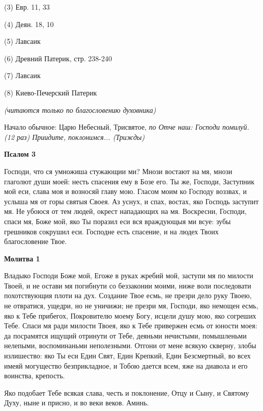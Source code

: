 (3) Евр. 11, 33

(4) Деян. 18, 10

(5) Лавсаик

(6) Древний Патерик, стр. 238-240

(7) Лавсаик

(8) Киево-Печерский Патерик


\mychapterending

 


\itshape (читаются только по благословению духовника)

\normalfont{}

Начало обычное: Царю Небесный,  Трисвятое,  \itshape по\normalfont{} Отче наш: Господи помилуй. (12 раз) Приидите, поклонимся... (\itshape Трижды\normalfont{})


\medskip


\bfseries Псалом 3\normalfont{}


Господи, что ся умножиша стужающии ми? Мнози востают на мя, мнози глаголют души моей: несть спасения ему в Бозе его. Ты же, Господи, Заступник мой еси, слава моя и возносяй главу мою. Гласом моим ко Господу воззвах, и услыша мя от горы святыя Своея. Аз уснух, и спах, востах, яко Господь заступит мя. Не убоюся от тем людей, окрест нападающих на мя. Воскресни, Господи, спаси мя, Боже мой, яко Ты поразил еси вся враждующыя ми всуе: зубы грешников сокрушил еси. Господне есть спасение, и на людех Твоих благословение Твое.


\medskip


\bfseries Молитва 1\normalfont{}


Владыко Господи Боже мой, Егоже в руках жребий мой, заступи мя по милости Твоей, и не остави мя погибнути со беззаконии моими, ниже воли последовати похотствующия плоти на дух. Создание Твое есмь, не презри дело руку Твоею, не отвратися, ущедри, но не уничижи;  не презри мя, Господи, яко немощен есмь, яко к Тебе прибегох, Покровителю моему Богу, исцели душу мою, яко согреших Тебе. Спаси мя ради милости Твоея, яко к Тебе привержен есмь от юности моея: да посрамятся ищущий отринути от Тебе, деяньми нечистыми, помышленьми  нелепыми,  воспоминаньми неполезными. Отгони от мене всякую скверну, злобы излишество: яко Ты еси Един Свят, Един Крепкий, Един Безсмертный, во всех имеяй могущество безприкладное, и Тобою дается всем, яже на диавола и его воинства, крепость.

Яко подобает Тебе всякая слава, честь и поклонение, Отцу и Сыну, и Святому Духу, ныне и присно, и во веки веков. Аминь.


